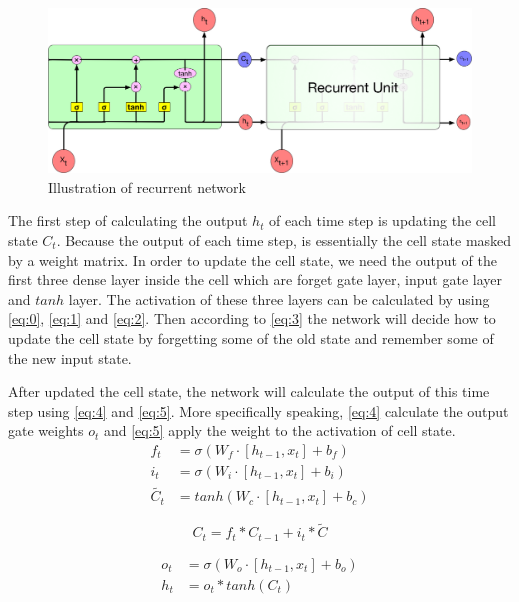 \begin{figure}[h] 
	\centering
	\includegraphics[width=6.0in]{Figures/recurrent4}
	\caption[Detail inside LSTM]{Illustration of recurrent network}
	\label{fig:3}
\end{figure}

The first step of calculating the output $h_t$ of each time step is updating the cell state $C_t$. Because the output of each time step, is essentially the cell state masked by a weight matrix. In order to update the cell state, we need the output of the first three dense layer inside the cell which are forget gate layer, input gate layer and $tanh$ layer. The activation of these three layers can be calculated by using \ref{eq:0}, \ref{eq:1} and \ref{eq:2}. Then according to  \ref{eq:3} the network will decide how to update the cell state by forgetting some of the old state and remember some of the new input state.\par
After updated the cell state, the network will calculate the output of this time step using \ref{eq:4} and \ref{eq:5}. More specifically speaking, \ref{eq:4} calculate the output gate weights $o_t$ and  \ref{eq:5} apply the weight to the activation of cell state. 
\begin{subequations} 
    \begin{align}
    	f_{ t }&=\sigma (W_{ f }\cdot [h_{t-1} , x_t] +b_f) \label{eq:0}\\	
        i_t &= \sigma(W_i \cdot[h_{t-1}, x_t] + b_i)\label{eq:1}\\
        \tilde {  {C _t } } &= tanh(W_c\cdot [h_{t-1}, x_t]+ b_c) \label{eq:2}
    \end{align}	
\end{subequations}




\begin{equation} \label{eq:3}
    C_t = f_t\ast C_{t-1} +i_t\ast \tilde{C}
\end{equation}

\begin{subequations}
    \begin{align}
        o_t &= \sigma(W_o\cdot [h_{t-1}, x_t] +b_o) \label{eq:4}\\
        h_t &= o_t \ast tanh(C_t) \label{eq:5}
    \end{align}
\end{subequations}

